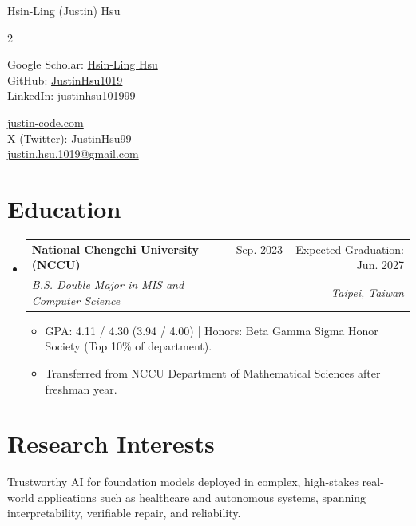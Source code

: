 \documentclass[letterpaper,10pt]{article}
\makeatletter
\newcommand{\resumeItem}[1]{
  \item\small{
    {#1 \vspace{-2pt}}
  }
}
\newcommand{\resumeSubheading}[4]{
  \vspace{-2pt}\item
    \begin{tabular*}{0.97\textwidth}[t]{l@{\extracolsep{\fill}}r}
      \textbf{#1} & #2 \\
      \textit{\small#3} & \textit{\small #4} \\
    \end{tabular*}\vspace{-7pt}
}
\newcommand{\resumeSubHeadingListStart}{\begin{itemize}[leftmargin=0.15in, label={}]}
\newcommand{\resumeSubHeadingListEnd}{\end{itemize}}
\newcommand{\resumeItemListStart}{\begin{itemize}}
\newcommand{\resumeItemListEnd}{\end{itemize}\vspace{-5pt}}
\makeatother
\begin{document}
\begin{center}
    {\LARGE Hsin-Ling (Justin) Hsu} \\ \vspace{2pt}
    \begin{multicols}{2}
    \begin{flushleft}
    Google Scholar: \href{{https://scholar.google.com/citations?user=pCXJM5AAAAAJ}}{Hsin-Ling Hsu} \\ \vspace{1pt}
    GitHub: \href{{https://github.com/justinHsu1019}}{JustinHsu1019}\\ \vspace{1pt}
    LinkedIn: \href{{https://www.linkedin.com/in/justinhsu101999}}{justinhsu101999}
    \end{flushleft}
    \begin{flushright}
    \href{{https://justin-code.com}}{justin-code.com}\\ \vspace{1pt}
    X (Twitter): \href{{https://x.com/JustinHsu99}}{JustinHsu99}\\ \vspace{1pt}
    \href{mailto:justin.hsu.1019@gmail.com}{justin.hsu.1019@gmail.com}
    \end{flushright}
    \end{multicols}
\end{center}

\vspace{-15pt}
\section{Education}
  \resumeSubHeadingListStart
      \resumeSubheading
      {National Chengchi University (NCCU)}{Sep. 2023 -- Expected Graduation: Jun. 2027}
      {B.S. Double Major in MIS and Computer Science}{Taipei, Taiwan}
      \resumeItemListStart
      \vspace{0.3em}
        \resumeItem{GPA: 4.11 / 4.30 (3.94 / 4.00) | Honors: Beta Gamma Sigma Honor Society (Top 10\% of department).}
        \resumeItem{Transferred from NCCU Department of Mathematical Sciences after freshman year.}
      \resumeItemListEnd
  \resumeSubHeadingListEnd

\section{Research Interests}
Trustworthy AI for foundation models deployed in complex, high-stakes real-world applications such as healthcare and autonomous systems, spanning interpretability, verifiable repair, and reliability.
\end{document}
